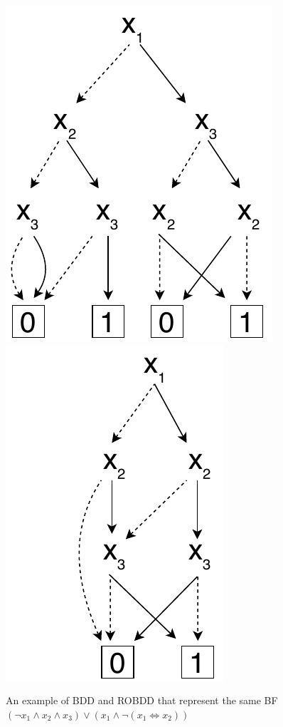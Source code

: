 \documentclass[
  digital, %
  twoside, %
  table,   %
  nolof,     %
  nolot,     %
]{fithesis3}
\theoremstyle{definition}
\theoremstyle{remark}
\newcommand{\lequal}{\Leftrightarrow}
\begin{document}
\begin{figure}[ht!]
    \centering
        {\includegraphics{figures/bdd1.pdf}}
        {\includegraphics{figures/bdd2.pdf}}
    \caption{An example of BDD and ROBDD that represent the same BF $(\neg x_1 \land x_2 \land x_3) \lor (x_1 \land \neg (x_1 \lequal x_2))$}
    \label{fig:my_label}
\end{figure}
\end{document}

